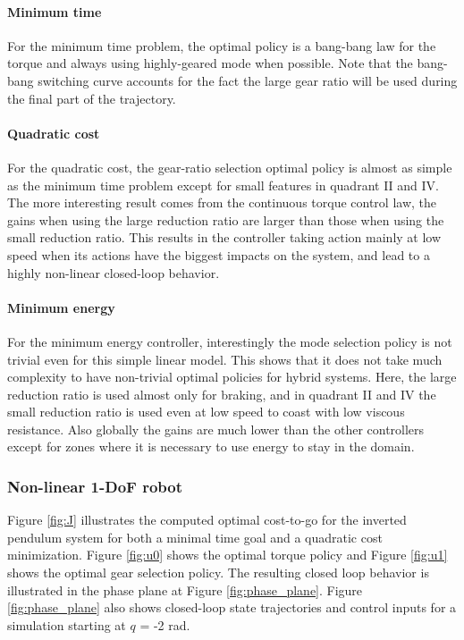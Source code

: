 \paragraph{Minimum time}
\label{sec:MinimumTime}
For the minimum time problem, the optimal policy is a bang-bang law for the torque and always using highly-geared mode when possible. Note that the bang-bang switching curve accounts for the fact the large gear ratio will be used during the final part of the trajectory.

\paragraph{Quadratic cost}
\label{sec:QuadraticCost}
For the quadratic cost, the gear-ratio selection optimal policy is almost as simple as the minimum time problem except for small features in quadrant II and IV. The more interesting result comes from the continuous torque control law, the gains when using the large reduction ratio are larger than those when using the small reduction ratio. This results in the controller taking action mainly at low speed when its actions have the biggest impacts on the system, and lead to a highly non-linear closed-loop behavior.

\paragraph{Minimum energy}
\label{sec:MinimumEnergy}
For the minimum energy controller, interestingly the mode selection policy is not trivial even for this simple linear model.  This shows that it does not take much complexity to have non-trivial optimal policies for hybrid systems. Here, the large reduction ratio is used almost only for braking, and in quadrant II and IV the small reduction ratio is used even at low speed to coast with low viscous resistance. Also globally the gains are much lower than the other controllers except for zones where it is necessary to use energy to stay in the domain. 

\subsubsection{Non-linear 1-DoF robot}

Figure \ref{fig:J} illustrates the computed optimal cost-to-go for the inverted pendulum system for both a minimal time goal and a quadratic cost minimization. Figure \ref{fig:u0} shows the optimal torque policy and Figure \ref{fig:u1} shows the optimal gear selection policy. The resulting closed loop behavior is illustrated in the phase plane at Figure \ref{fig:phase_plane}. Figure \ref{fig:phase_plane} also shows closed-loop state trajectories and control inputs for a simulation starting at $q$ = -2 rad.

